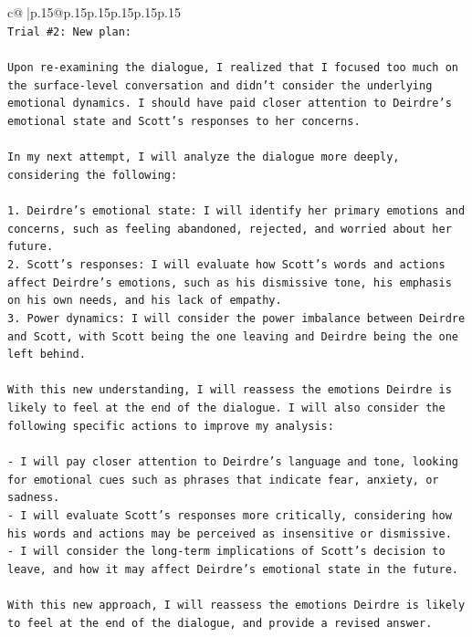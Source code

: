 \documentclass{article}
\begin{document}
{\begin{supertabular}{c@{$\;$}|p{.15\linewidth}@{}p{.15\linewidth}p{.15\linewidth}p{.15\linewidth}p{.15\linewidth}p{.15\linewidth}}
{{{\\ 
\texttt{Trial \#2: New plan: } \\
\\ 
\texttt{Upon re{-}examining the dialogue, I realized that I focused too much on the surface{-}level conversation and didn't consider the underlying emotional dynamics. I should have paid closer attention to Deirdre's emotional state and Scott's responses to her concerns. } \\
\\ 
\texttt{In my next attempt, I will analyze the dialogue more deeply, considering the following:} \\
\\ 
\texttt{1. Deirdre's emotional state: I will identify her primary emotions and concerns, such as feeling abandoned, rejected, and worried about her future.} \\
\texttt{2. Scott's responses: I will evaluate how Scott's words and actions affect Deirdre's emotions, such as his dismissive tone, his emphasis on his own needs, and his lack of empathy.} \\
\texttt{3. Power dynamics: I will consider the power imbalance between Deirdre and Scott, with Scott being the one leaving and Deirdre being the one left behind.} \\
\\ 
\texttt{With this new understanding, I will reassess the emotions Deirdre is likely to feel at the end of the dialogue. I will also consider the following specific actions to improve my analysis:} \\
\\ 
\texttt{{-} I will pay closer attention to Deirdre's language and tone, looking for emotional cues such as phrases that indicate fear, anxiety, or sadness.} \\
\texttt{{-} I will evaluate Scott's responses more critically, considering how his words and actions may be perceived as insensitive or dismissive.} \\
\texttt{{-} I will consider the long{-}term implications of Scott's decision to leave, and how it may affect Deirdre's emotional state in the future.} \\
\\ 
\texttt{With this new approach, I will reassess the emotions Deirdre is likely to feel at the end of the dialogue, and provide a revised answer.} \\
\\ 
\\ 
\\ 
}}}
\end{supertabular}}
\end{document}
